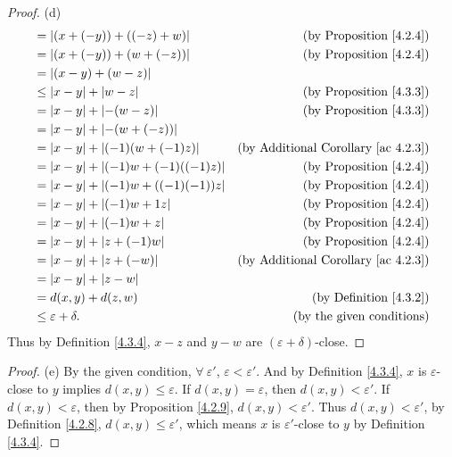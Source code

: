 \begin{proof}{(d)}
\begin{align*}
         & = \abs*{(x + (-y)) + ((-z) + w)}            & \text{(by Proposition \ref{4.2.4})}             \\
         & = \abs*{(x + (-y)) + (w + (-z))}            & \text{(by Proposition \ref{4.2.4})}             \\
         & = \abs*{(x - y) + (w - z)}                                                                    \\
         & \leq \abs*{x - y} + \abs*{w - z}            & \text{(by Proposition \ref{4.3.3})}             \\
         & = \abs*{x - y} + \abs*{-(w - z)}            & \text{(by Proposition \ref{4.3.3})}             \\
         & = \abs*{x - y} + \abs*{-(w + (-z))}                                                           \\
         & = \abs*{x - y} + \abs*{(-1)(w + (-1)z)}     & \text{(by Additional Corollary \ref{ac 4.2.3})} \\
         & = \abs*{x - y} + \abs*{(-1)w + (-1)((-1)z)} & \text{(by Proposition \ref{4.2.4})}             \\
         & = \abs*{x - y} + \abs*{(-1)w + ((-1)(-1))z} & \text{(by Proposition \ref{4.2.4})}             \\
         & = \abs*{x - y} + \abs*{(-1)w + 1z}          & \text{(by Proposition \ref{4.2.4})}             \\
         & = \abs*{x - y} + \abs*{(-1)w + z}           & \text{(by Proposition \ref{4.2.4})}             \\
         & = \abs*{x - y} + \abs*{z + (-1)w}           & \text{(by Proposition \ref{4.2.4})}             \\
         & = \abs*{x - y} + \abs*{z + (-w)}            & \text{(by Additional Corollary \ref{ac 4.2.3})} \\
         & = \abs*{x - y} + \abs*{z - w}                                                                 \\
         & = d(x, y) + d(z, w)                         & \text{(by Definition \ref{4.3.2})}              \\
         & \leq \varepsilon + \delta.                  & \text{(by the given conditions)}
    \end{align*}
    Thus by Definition \ref{4.3.4}, \(x - z\) and \(y - w\) are \((\varepsilon + \delta)\)-close.
\end{proof}

\begin{proof}{(e)}
    By the given condition, \(\forall\ \varepsilon'\), \(\varepsilon < \varepsilon'\).
    And by Definition \ref{4.3.4}, \(x\) is \(\varepsilon\)-close to \(y\) implies \(d(x, y) \leq \varepsilon\).
    If \(d(x, y) = \varepsilon\), then \(d(x, y) < \varepsilon'\).
    If \(d(x, y) < \varepsilon\), then by Proposition \ref{4.2.9}, \(d(x, y) < \varepsilon'\).
    Thus \(d(x, y) < \varepsilon'\), by Definition \ref{4.2.8}, \(d(x, y) \leq \varepsilon'\), which means \(x\) is \(\varepsilon'\)-close to \(y\) by Definition \ref{4.3.4}.
\end{proof}

